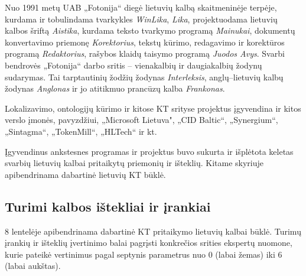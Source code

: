 \begin{multicols}{2}
    Nuo 1991 metų UAB „Fotonija“ diegė lietuvių kalbą skaitmeninėje terpėje, kurdama ir tobulindama tvarkykles \textit{WinLika}, \textit{Lika}, projektuodama lietuvių kalbos šriftą \textit{Aistika}, kurdama teksto tvarkymo programą \textit{Mainukai}, dokumentų konvertavimo priemonę \textit{Korektorius}, tekstų kūrimo, redagavimo ir korektūros programą \textit{Redaktorius}, rašybos klaidų taisymo programą \textit{Juodos Avys}. Svarbi bendrovės „Fotonija“ darbo sritis – vienakalbių ir daugiakalbių žodynų sudarymas. Tai tarptautinių žodžių žodynas \textit{Interleksis}, anglų–lietuvių kalbų žodynas \textit{Anglonas} ir jo atitikmuo prancūzų kalba \textit{Frankonas}.   

Lokalizavimo, ontologijų kūrimo ir kitose KT srityse projektus įgyvendina ir kitos verslo įmonės, pavyzdžiui, „Microsoft Lietuva", „CID Baltic“, „Synergium“, „Sintagma“, „TokenMill“, „HLTech“ ir kt. 

Įgyvendinus ankstesnes programas ir projektus buvo sukurta ir išplėtota keletas svarbių lietuvių kalbai pritaikytų priemonių ir išteklių. Kitame skyriuje apibendrinama dabartinė lietuvių KT būklė.

\subsection{Turimi kalbos ištekliai ir įrankiai}

8 lentelėje apibendrinama dabartinė KT pritaikymo lietuvių kalbai būklė. Turimų įrankių ir išteklių įvertinimo balai pagrįsti  konkrečios srities ekspertų nuomone,  kurie pateikė vertinimus pagal septynis parametrus nuo 0 (labai žemas) iki 6 (labai aukštas).


\end{multicols}
